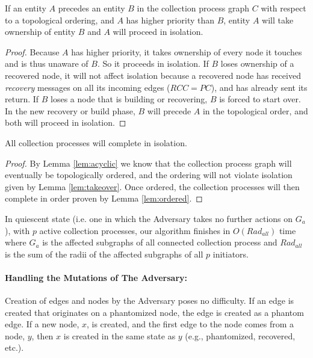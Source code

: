 \begin{lemma}
If an entity $A$ precedes an entity $B$ in the collection process
graph $C$ with respect to a topological ordering, and $A$ has higher priority than $B$, entity $A$ will take ownership of
entity $B$ and $A$ will proceed in isolation.
\label{lem:takeover}
\end{lemma}
\begin{proof}
Because $A$ has higher priority, it takes ownership of every node it
touches and is thus unaware of $B$. So it proceeds in isolation. If $B$ loses
ownership of a recovered node, it will not affect isolation because a recovered
node has received \emph{recovery} messages on all its incoming edges ($RCC=PC$),
and has already sent its return.
If $B$ loses a node that is building or recovering,
$B$ is forced to start over. In
the new recovery or build phase, $B$ will precede $A$ in the  topological order, and both will
proceed in isolation. %
\end{proof}

\begin{theorem}
All collection processes will complete in isolation.
\label{thm:alliso}
\end{theorem}
\begin{proof}
By Lemma \ref{lem:acyclic} we know that the collection process graph will eventually
be topologically ordered, and the ordering will not violate
isolation given by Lemma \ref{lem:takeover}. Once ordered, the
collection processes will then complete in order proven by Lemma \ref{lem:ordered}.
\end{proof}

\begin{corollary}
In quiescent state (i.e. one in which the Adversary takes no further actions on $G_{a}$), with $p$ active collection processes, our algorithm finishes in $O(Rad_{all})$ time where $G_{a}$ is the
affected subgraphs of all connected collection process and
$Rad_{all}$ is the sum of the radii of the affected subgraphs of all $p$ initiators.
\end{corollary}

\paragraph{Handling the Mutations of The Adversary:}
Creation of edges and nodes by the Adversary poses no difficulty. If an edge is
created that originates on a phantomized node, the edge is created as a phantom
edge. If a new node, $x$, is created, and the first edge to the node comes from
a node, $y$, then $x$ is created in the same state as $y$ (e.g., phantomized,
recovered, etc.).

